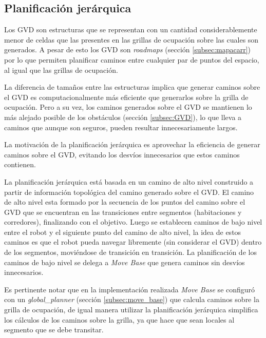 \subsection{Planificación jerárquica}
Los GVD son estructuras que se representan con un cantidad considerablemente
menor de celdas que las presentes en las grillas de ocupación sobre las cuales son
generados. A pesar de esto los GVD son \emph{roadmaps} (sección
\ref{subsec:mapacarr}) por lo que permiten planificar caminos entre cualquier
par de puntos del espacio, al igual que las grillas de ocupación. 

La diferencia de tamaños entre las estructuras implica que generar caminos
sobre el GVD es computacionalmente más eficiente que generarlos sobre la grilla
de ocupación. Pero a su vez, los caminos generados sobre el GVD se mantienen lo
más alejado posible de los obstáculos (sección \ref{subsec:GVD}), lo que lleva
a caminos que aunque son seguros, pueden resultar innecesariamente largos.

La motivación de la planificación jerárquica es aprovechar la eficiencia de
generar caminos sobre el GVD, evitando los desvíos innecesarios que estos
caminos contienen.

La planificación jerárquica está basada en un camino de alto nivel construido a
partir de información topológica del camino generado sobre el GVD.
El camino de alto nivel esta formado por la secuencia de los puntos del camino sobre
el GVD que se encuentran en las transiciones entre segmentos (habitaciones
y corredores), finalizando con el objetivo. Luego se establecen caminos de bajo
nivel entre el robot y el siguiente punto del camino de alto nivel, la idea de
estos caminos es que el robot pueda navegar libremente (sin considerar el GVD)
dentro de los segmentos, moviéndose de transición en transición. La
planificación de los caminos de bajo nivel se delega a \emph{Move Base} que
genera caminos sin desvíos innecesarios.

Es pertinente notar que en la implementación realizada \emph{Move Base} se
configuró con un \emph{global\_planner} (sección \ref{subsec:move_base}) que
calcula caminos sobre la grilla de ocupación, de igual manera utilizar la
planificación jerárquica simplifica los cálculos de los caminos sobre la grilla,
ya que hace que sean locales al segmento que se debe transitar. %

